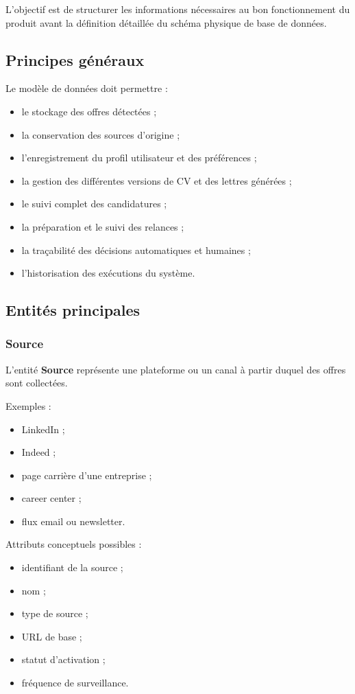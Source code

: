 \documentclass[11pt,a4paper]{article}
\begin{document}
L’objectif est de structurer les informations nécessaires au bon fonctionnement du produit avant la définition détaillée du schéma physique de base de données.

\subsection{Principes généraux}

Le modèle de données doit permettre :

\begin{itemize}
    \item le stockage des offres détectées ;
    \item la conservation des sources d’origine ;
    \item l’enregistrement du profil utilisateur et des préférences ;
    \item la gestion des différentes versions de CV et des lettres générées ;
    \item le suivi complet des candidatures ;
    \item la préparation et le suivi des relances ;
    \item la traçabilité des décisions automatiques et humaines ;
    \item l’historisation des exécutions du système.
\end{itemize}

\subsection{Entités principales}

\subsubsection{Source}

L’entité \textbf{Source} représente une plateforme ou un canal à partir duquel des offres sont collectées.

Exemples :
\begin{itemize}
    \item LinkedIn ;
    \item Indeed ;
    \item page carrière d’une entreprise ;
    \item career center ;
    \item flux email ou newsletter.
\end{itemize}

Attributs conceptuels possibles :
\begin{itemize}
    \item identifiant de la source ;
    \item nom ;
    \item type de source ;
    \item URL de base ;
    \item statut d’activation ;
    \item fréquence de surveillance.
\end{itemize}
\end{document}
